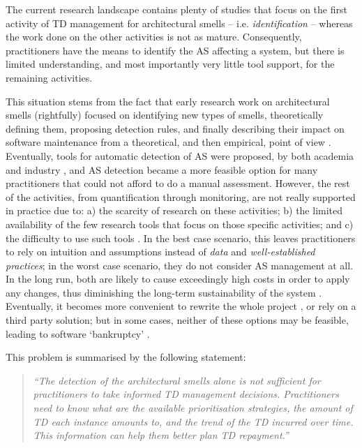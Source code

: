 The current research landscape contains plenty of studies that focus on the first activity of TD management for architectural smells -- i.e.  \emph{identification} -- whereas the work done on the other activities is not as mature.
Consequently, practitioners have the means to identify the AS affecting a system, but there is limited understanding, and most importantly very little tool support, for the remaining activities.

This situation stems from the fact that early research work on architectural smells (rightfully) focused on identifying new types of smells, theoretically defining them, proposing detection rules, and finally describing their impact on software maintenance from a theoretical, and then empirical, point of view \cite{Lippert2006,Garcia2009,Mo2015,Le2016,Arcelli2016}.
Eventually, tools for automatic detection of AS were proposed, by both academia and industry \cite{Avgeriou2021,Khomyakov2020}, and AS detection became a more feasible option for many practitioners that could not afford to do a manual assessment.
However, the rest of the activities, from quantification through monitoring, are not really supported in practice due to: a) the scarcity of research on these activities; b) the limited availability of the few research tools that focus on those specific activities; and c) the difficulty to use such tools \cite{Khomyakov2020}.
In the best case scenario, this leaves practitioners to rely on intuition and assumptions instead of \emph{data} and \emph{well-established practices}; in the worst case scenario, they do not consider AS management at all.
In the long run, both are likely to cause exceedingly high costs in order to apply any changes, thus diminishing the long-term sustainability of the system \cite{Winters2020}. 
Eventually, it becomes more convenient to rewrite the whole project \cite{Lehman1979}, or rely on a third party solution; but in some cases, neither of these options may be feasible, leading to software `bankruptcy' \cite{Ampatzoglou2015}.

This problem is summarised by the following statement:
\begin{quote}\itshape
    ``The detection of the architectural smells alone is not sufficient for practitioners to take informed TD management decisions.
    Practitioners need to know what are the available prioritisation strategies, the amount of TD each instance amounts to, and the trend of the TD incurred over time. This information can help them better plan TD repayment.''
\end{quote}


